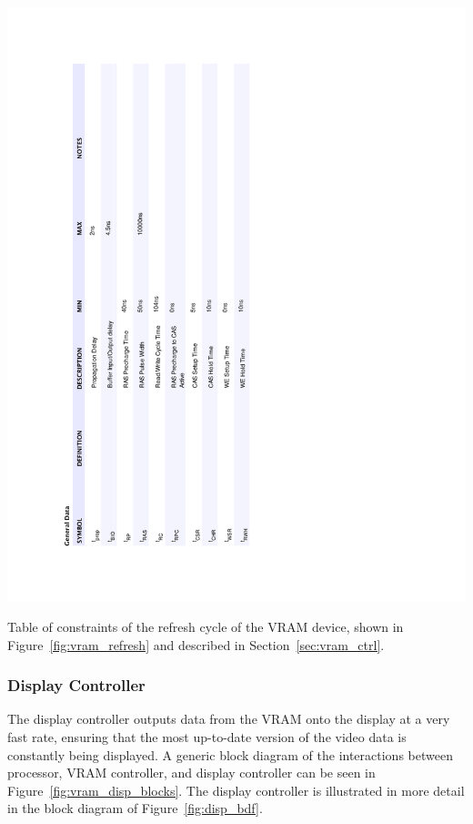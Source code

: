 \documentclass[titlepage]{scrartcl}
\begin{document}
	\begin{table}[h!]
	\vspace{-2cm}
	\centerline{\includegraphics[width=20cm]{img/vram_refresh_table.pdf}}
		\vspace{0cm}
                	\caption{Table of constraints of the refresh cycle of the VRAM device, shown in Figure~\ref{fig:vram_refresh} and described in Section~\ref{sec:vram_ctrl}.}
               	\label{tab:vram_refresh}
	\end{table}
	
	\clearpage

	\subsubsection{Display Controller \label{sec:disp_ctrl}}
	The display controller outputs data from the VRAM onto the display at a very fast rate, ensuring that the most up-to-date version of the video data is constantly being displayed. A generic block diagram of the interactions between processor, VRAM controller, and display controller can be seen in Figure~\ref{fig:vram_disp_blocks}. The display controller is illustrated in more detail in the block diagram of Figure~\ref{fig:disp_bdf}.\\
\end{document}
